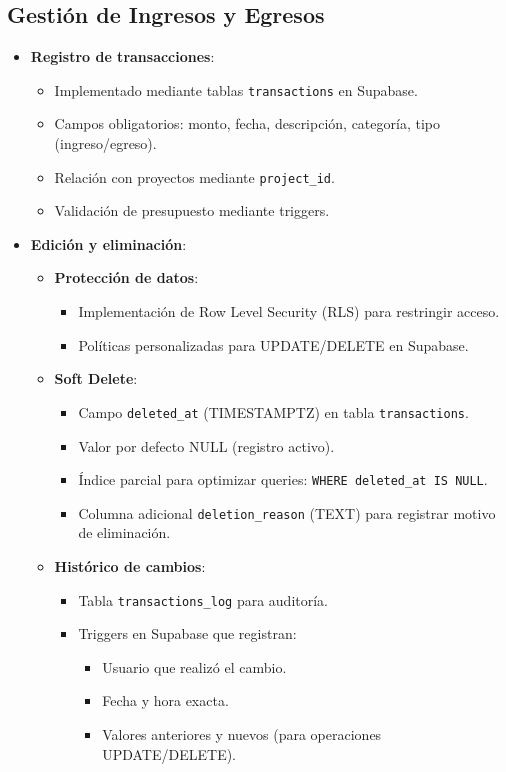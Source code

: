 \subsection*{Gestión de Ingresos y Egresos}
\begin{itemize}
    \item \textbf{Registro de transacciones}:
    \begin{itemize}
        \item Implementado mediante tablas \texttt{transactions} en Supabase.
        \item Campos obligatorios: monto, fecha, descripción, categoría, tipo (ingreso/egreso).
        \item Relación con proyectos mediante \texttt{project\_id}.
        \item Validación de presupuesto mediante triggers.
    \end{itemize}
    
    \item \textbf{Edición y eliminación}:
    \begin{itemize}
        \item \textbf{Protección de datos}:
        \begin{itemize}
            \item Implementación de Row Level Security (RLS) para restringir acceso.
            \item Políticas personalizadas para UPDATE/DELETE en Supabase.
        \end{itemize}
        
        \item \textbf{Soft Delete}:
        \begin{itemize}
            \item Campo \texttt{deleted\_at} (TIMESTAMPTZ) en tabla \texttt{transactions}.
            \item Valor por defecto NULL (registro activo).
            \item Índice parcial para optimizar queries: \texttt{WHERE deleted\_at IS NULL}.
            \item Columna adicional \texttt{deletion\_reason} (TEXT) para registrar motivo de eliminación.
        \end{itemize}
        
        \item \textbf{Histórico de cambios}:
        \begin{itemize}
            \item Tabla \texttt{transactions\_log} para auditoría.
            \item Triggers en Supabase que registran:
            \begin{itemize}
                \item Usuario que realizó el cambio.
                \item Fecha y hora exacta.
                \item Valores anteriores y nuevos (para operaciones UPDATE/DELETE).
            \end{itemize}
        \end{itemize}
    \end{itemize}
    

\end{itemize}
